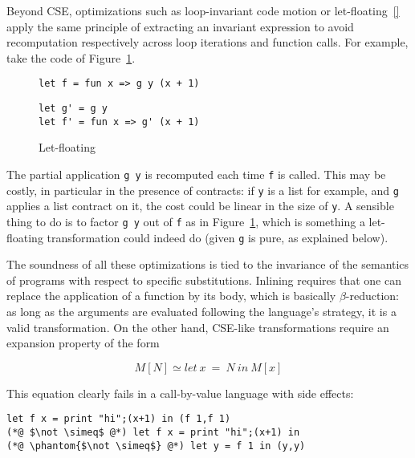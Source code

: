 \documentclass[sigplan,10pt,review,anonymous]{acmart}
\begin{document}
Beyond CSE, optimizations such as loop-invariant code motion or
let-floating~\ref{} apply the same principle of extracting an invariant
expression to avoid recomputation respectively across loop iterations and
function calls. For example, take the code of
Figure~\ref{fig:optimizations-let-floating-ex}.

\begin{figure}
  \begin{center}
\begin{lstlisting}[language=nickel,title={Source program}]
let f = fun x => g y (x + 1)
\end{lstlisting}
\begin{lstlisting}[language=nickel,title={Optimized program}]
let g' = g y
let f' = fun x => g' (x + 1)
\end{lstlisting}
  \end{center}
\caption{Let-floating}
\label{fig:optimizations-let-floating-ex}
\end{figure}

The partial application \lstinline+g y+ is recomputed each time \lstinline+f+ is
called. This may be costly, in particular in the presence of contracts: if
\lstinline+y+ is a list for example, and \lstinline+g+ applies a list contract
on it, the cost could be linear in the size of \lstinline+y+. A sensible thing
to do is to factor \lstinline+g y+ out of \lstinline+f+ as in
Figure~\ref{fig:optimizations-let-floating-ex}, which is something a
let-floating transformation could indeed do (given \lstinline+g+ is pure, as
explained below).

The soundness of all these optimizations is tied to the invariance of the
semantics of programs with respect to specific substitutions. Inlining requires
that one can replace the application of a function by its body, which is
basically $\beta$-reduction: as long as the arguments are evaluated following
the language's strategy, it is a valid transformation. On the other hand,
CSE-like transformations require an expansion property of the form

$$M[N] \simeq let~x~=~N~in~M[x]$$

This equation clearly fails in a call-by-value language with side effects:

\begin{lstlisting}[language=Nickel]
let f x = print "hi";(x+1) in (f 1,f 1)
(*@ $\not \simeq$ @*) let f x = print "hi";(x+1) in
(*@ \phantom{$\not \simeq$} @*) let y = f 1 in (y,y)
\end{lstlisting}
\end{document}

